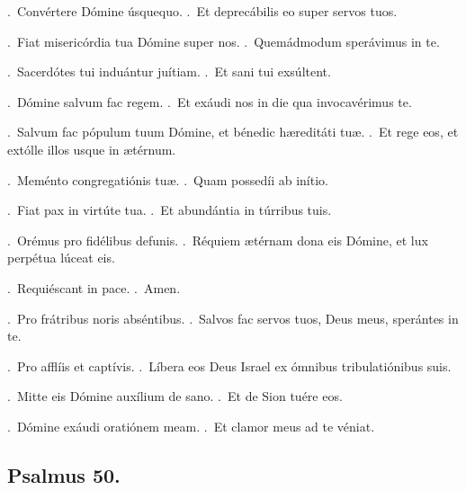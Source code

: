 \documentclass[12pt]{article} %
\newenvironment{response}{\leftskip 0in \setlength{\parindent}{0in}}{\vspace{2 mm}}
\let\oldgresixstar\gresixstar
\renewcommand{\gresixstar}{\textcolor{benred8}{\oldgresixstar}}
\let\oldVbar\Vbar
\renewcommand{\Vbar}{\textcolor{benred8}{\oldVbar .}}
\let\oldRbar\Rbar
\renewcommand{\Rbar}{\textcolor{benred8}{\oldRbar .}}
\begin{document}
\begin{response}
\Vbar\ Conv\'{e}rtere D\'{o}mine \'{u}squequo.
\Rbar\ Et deprec\'{a}bilis eo super servos tuos.

\Vbar\ Fiat miseric\'{o}rdia tua D\'{o}mine super nos.
\Rbar\ Quem\'{a}dmodum sper\'{a}vimus in te.

\Vbar\ Sacerd\'{o}tes tui indu\'{a}ntur ju\'{i}tiam.
\Rbar\ Et sani tui exs\'{u}ltent.

\Vbar\ D\'{o}mine salvum fac regem.
\Rbar\ Et ex\'{a}udi nos in die qua invocav\'{e}rimus te.

\Vbar\ Salvum fac p\'{o}pulum tuum D\'{o}mine, et b\'{e}nedic h\ae redit\'{a}ti tu\ae .
\Rbar\ Et rege eos, et ext\'{o}lle illos usque in \ae t\'{e}rnum.

\Vbar\ Mem\'{e}nto congregati\'{o}nis tu\ae .
\Rbar\ Quam possed\'{i}i ab in\'{i}tio.

\Vbar\ Fiat pax in virt\'{u}te tua. 
\Rbar\ Et abund\'{a}ntia in t\'{u}rribus tuis.

\Vbar\ Or\'{e}mus pro fid\'{e}libus defunis.
\Rbar\ R\'{e}quiem \ae t\'{e}rnam dona eis D\'{o}mine, et lux perp\'{e}tua l\'{u}ceat eis.

\Vbar\ Requi\'{e}scant in pace.
\Rbar\ Amen.

\Vbar\ Pro fr\'{a}tribus noris abs\'{e}ntibus.
\Rbar\ Salvos fac servos tuos, Deus meus, sper\'{a}ntes in te.

\Vbar\ Pro affl\'{i}is et capt\'{i}vis.
\Rbar\ L\'{i}bera eos Deus Israel ex \'{o}mnibus tribulati\'{o}nibus suis.

\Vbar\ Mitte eis D\'{o}mine aux\'{i}lium de sano.
\Rbar\ Et de Sion tu\'{e}re eos.

\Vbar\ D\'{o}mine ex\'{a}udi orati\'{o}nem meam.
\Rbar\ Et clamor meus ad te v\'{e}niat.

\end{response}

\subsection*{Psalmus 50.}



\end{document}
